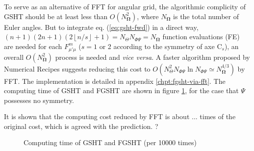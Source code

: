 To serve as an alternative of FFT for angular grid, the algorithmic
complicity of GSHT should be at least less than $O(N_{\mathbf{\Omega}}^{2})$,
where $N_{\mathbf{\Omega}}$ is the total number of Euler angles.
But to integrate eq. (\ref{eq:gsht-fwd}) in a direct way, $(n+1)(2n+1)(2\left\lfloor n/s\right\rfloor +1)=N_{\Theta}N_{\Phi\Psi}=N_{\mathbf{\Omega}}$
function evaluations (FE) are needed for each $F_{\mu'\mu}^{m}$ ($s=1$
or 2 according to the symmetry of axe $\mathrm{C}_{s}$), an overall
$O(N_{\mathbf{\Omega}}^{2})$ process is needed and \textit{vice versa}.
A faster algorithm proposed by Numerical Recipes \citep{Numerical_Recipes_3ed}
suggests reducing this cost to $O(N_{\Theta}^{2}N_{\Phi\Psi}\ln N_{\Phi\Psi}\simeq N_{\mathbf{\Omega}}^{4/3})$
by FFT. The implementation is detailed in appendix \ref{chpt:fgsht-via-fft}.
The computing time of GSHT and FGSHT are shown in figure \ref{fig:time-gsht-fgsht},
for the case that $\Psi$ possesses no symmetry.

It is shown that the computing cost reduced by FFT is about ... times
of the original cost, which is agreed with the prediction. ? 

\begin{figure}[h]
\begin{centering}
\par\end{centering}
\begin{centering}
\par\end{centering}
\centering{}\caption{Computing time of GSHT and FGSHT (per 10000 times)\label{fig:time-gsht-fgsht}}
\end{figure}


